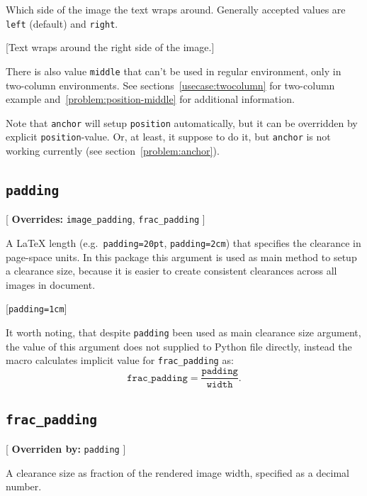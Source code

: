 \documentclass{article}
\begin{document}
Which side of the image the text wraps around. Generally accepted values are \texttt{left} (default) and \texttt{right}.

[Text wraps around the right side of the image.]

There is also value \texttt{middle} that can't be used in regular environment, only in two-column environments. See sections~\ref{usecase:twocolumn} for two-column example and~\ref{problem:position-middle} for additional
information.

Note that \texttt{anchor} will setup \texttt{position} automatically, but it can be overridden by explicit \texttt{position}-value. Or, at least, it suppose to do it, but \texttt{anchor} is not working currently (see section~\ref{problem:anchor}).

\clearpage

\subsection{\texttt{padding}}\label{macro:padding}

[
  \textbf{Overrides:} \texttt{image\_padding}, \texttt{frac\_padding}
]

A \LaTeX{} length (e.g.\ \texttt{padding=20pt}, \texttt{padding=2cm}) that specifies the clearance in page-space units. In this package this argument is used as main method to setup a clearance size, because it is easier to create consistent clearances across all images in document.

[\texttt{padding=1cm}]

It worth noting, that despite \texttt{padding} been used as main clearance size argument, the value of this argument does not supplied to Python file directly, instead the macro calculates implicit value for \texttt{frac\_padding} as:
\[
  \texttt{frac\_padding} = \frac{\texttt{padding}}{\texttt{width}}.
\]

\subsection{\texttt{frac\_padding}}\label{macro:frac_padding}

[
  \textbf{Overriden by:} \texttt{padding}
]

A clearance size as fraction of the rendered image width, specified as a decimal number.
\end{document}
